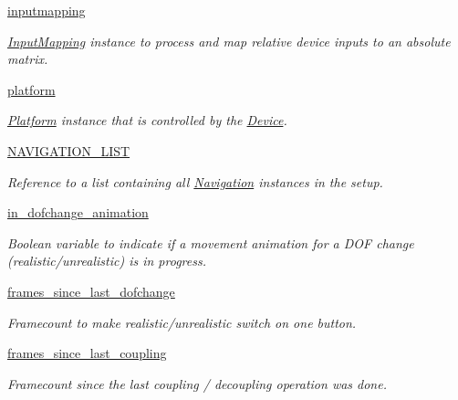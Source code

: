\begin{DoxyCompactItemize}
\hyperlink{classlib_1_1Navigation_1_1Navigation_a753651f998070a71fb557af66ea28a5f}{inputmapping}
\begin{DoxyCompactList}\small\item\em \hyperlink{namespacelib_1_1InputMapping}{\-Input\-Mapping} instance to process and map relative device inputs to an absolute matrix. \end{DoxyCompactList}\item 
\hyperlink{classlib_1_1Navigation_1_1Navigation_a98559fc1371f6d5de6e193e48e3b6c9b}{platform}
\begin{DoxyCompactList}\small\item\em \hyperlink{namespacelib_1_1Platform}{\-Platform} instance that is controlled by the \hyperlink{namespacelib_1_1Device}{\-Device}. \end{DoxyCompactList}\item 
\hyperlink{classlib_1_1Navigation_1_1Navigation_a1cb488485919adab7e0fcecedcbef1e0}{\-N\-A\-V\-I\-G\-A\-T\-I\-O\-N\-\_\-\-L\-I\-S\-T}
\begin{DoxyCompactList}\small\item\em \-Reference to a list containing all \hyperlink{classlib_1_1Navigation_1_1Navigation}{\-Navigation} instances in the setup. \end{DoxyCompactList}\item 
\hyperlink{classlib_1_1Navigation_1_1Navigation_aa883a59a839271d7e18e06c1517abad9}{in\-\_\-dofchange\-\_\-animation}
\begin{DoxyCompactList}\small\item\em \-Boolean variable to indicate if a movement animation for a \-D\-O\-F change (realistic/unrealistic) is in progress. \end{DoxyCompactList}\item 
\hyperlink{classlib_1_1Navigation_1_1Navigation_ad482cc59770a6af24c5f1387d4da052e}{frames\-\_\-since\-\_\-last\-\_\-dofchange}
\begin{DoxyCompactList}\small\item\em \-Framecount to make realistic/unrealistic switch on one button. \end{DoxyCompactList}\item 
\hyperlink{classlib_1_1Navigation_1_1Navigation_ab6d25d73b9860f66602f5a0d1d709e5d}{frames\-\_\-since\-\_\-last\-\_\-coupling}
\begin{DoxyCompactList}\small\item\em \-Framecount since the last coupling / decoupling operation was done. \end{DoxyCompactList}\item 

\end{DoxyCompactItemize}
